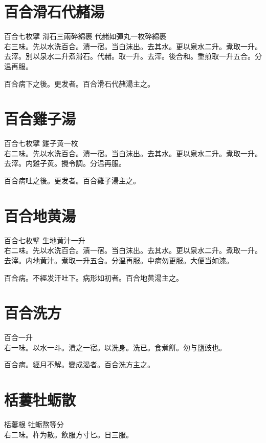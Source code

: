 \section{百合滑石代赭湯}

百合{\scriptsize 七枚擘} 滑石{\scriptsize 三兩碎綿裹} 代赭{\scriptsize 如彈丸一枚碎綿裹}\\
右三味。先以水洗百合。漬一宿。当白沫出。去其水。更以泉水二升。煮取一升。去滓。別以泉水二升煮滑石。代赭。取一升。去滓。後合和。重煎取一升五合。分温再服。

百合病下之後。更发者。百合滑石代赭湯主之。

\section{百合雞子湯}

百合{\scriptsize 七枚擘} 雞子黄{\scriptsize 一枚}\\
右二味。先以水洗百合。漬一宿。当白沫出。去其水。更以泉水二升。煮取一升。去滓。内雞子黄。攪令調。分温再服。

百合病吐之後。更发者。百合雞子湯主之。

\section{百合地黄湯}

百合{\scriptsize 七枚擘} 生地黄汁{\scriptsize 一升}\\
右二味。先以水洗百合。漬一宿。当白沫出。去其水。更以泉水二升。煮取一升。去滓。内地黄汁。煮取一升五合。分温再服。中病勿更服。大便当如漆。

百合病。不經发汗吐下。病形如初者。百合地黄湯主之。

\section{百合洗方}

百合{\scriptsize 一升}\\
右一味。以水一斗。漬之一宿。以洗身。洗已。食煮餅。勿与鹽豉也。

百合病。經月不解。變成渴者。百合洗方主之。

\section{栝蔞牡蛎散}

栝蔞根{ }牡蛎{\scriptsize 熬等分}\\
右二味。杵为散。飲服方寸匕。日三服。

